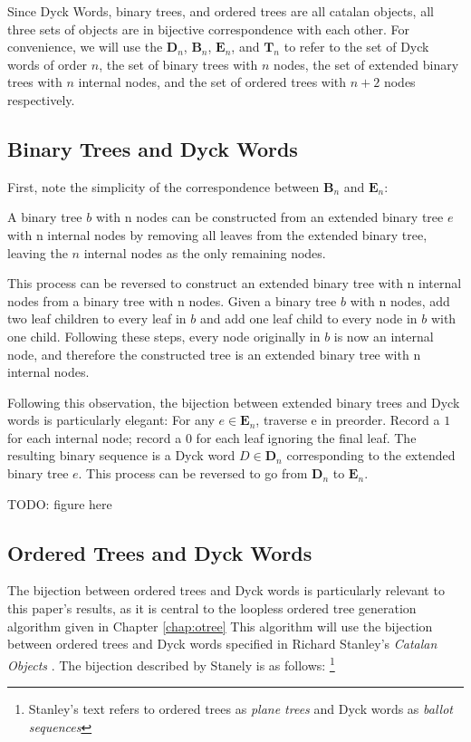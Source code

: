 Since Dyck Words, binary trees, and ordered trees are all catalan objects, all three sets of objects are in bijective correspondence with each other.  For convenience, we will use the $\mathbf{D}_n$, $\mathbf{B}_n$, $\mathbf{E}_n$, and $\mathbf{T}_n$ to refer to the set of Dyck words of order $n$, the set of binary trees with $n$ nodes, the set of extended binary trees with $n$ internal nodes, and the set of ordered trees with $n+2$ nodes respectively.  

\subsection{Binary Trees and Dyck Words}
First, note the simplicity of the correspondence between $\mathbf{B}_n$ and $\mathbf{E}_n$:

A binary tree $b$ with n nodes can be constructed from an extended binary tree $e$ with n internal nodes by removing all leaves from the extended binary tree, leaving the $n$ internal nodes as the only remaining nodes.

This process can be reversed to construct an extended binary tree with n internal nodes from a binary tree with n nodes. Given a binary tree $b$ with n nodes, add two leaf children to every leaf in $b$ and add one leaf child to every node in $b$ with one child. Following these steps, every node originally in $b$ is now an internal node, and therefore the constructed tree is an extended binary tree with n internal nodes.

Following this observation,
the bijection between extended binary trees and Dyck words is particularly elegant: 
For any $e \in \mathbf{E}_n$, traverse e in preorder.  Record a $1$ for each internal node; record a $0$ for each leaf ignoring the final leaf. The resulting binary sequence is a Dyck word  $D \in \mathbf{D}_n $ corresponding to the extended binary tree $e$.  This process can be reversed to go from $\mathbf{D}_n$ to $\mathbf{E}_n$.

TODO: figure here

\subsection{Ordered Trees and Dyck Words}
The bijection between ordered trees and Dyck words is particularly relevant to this paper's results, as it is central to the loopless ordered tree generation algorithm given in Chapter \ref{chap:otree}
This algorithm will use the bijection between ordered trees and Dyck words specified in Richard Stanley's \emph{Catalan Objects} \cite{stanley2015catalan}. The bijection described by Stanely is as follows:
\footnote{ Stanley's text refers to ordered trees as \emph{plane trees} and Dyck words as \emph{ballot sequences}} 


